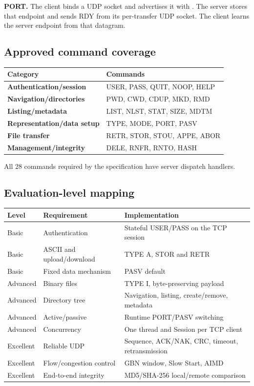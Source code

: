 \textbf{PORT.} The client binds a UDP socket and advertises it with
. The server stores that endpoint and sends RDY
from its per-transfer UDP socket. The client learns the server endpoint from
that datagram.

\subsection{Approved command coverage}

\begin{tabularx}{\textwidth}{>{\bfseries}p{}X}
\toprule
Category & Commands\\
\midrule
Authentication/session & USER, PASS, QUIT, NOOP, HELP\\
Navigation/directories & PWD, CWD, CDUP, MKD, RMD\\
Listing/metadata & LIST, NLST, STAT, SIZE, MDTM\\
Representation/data setup & TYPE, MODE, PORT, PASV\\
File transfer & RETR, STOR, STOU, APPE, ABOR\\
Management/integrity & DELE, RNFR, RNTO, HASH\\
\bottomrule
\end{tabularx}

All 28 commands required by the specification have server dispatch handlers.

\subsection{Evaluation-level mapping}

\begin{longtable}{p{}p{}p{}}
\toprule
Level & Requirement & Implementation\\
\midrule
Basic & Authentication & Stateful USER/PASS on the TCP session\\
Basic & ASCII and upload/download & TYPE A, STOR and RETR\\
Basic & Fixed data mechanism & PASV default\\
Advanced & Binary files & TYPE I, byte-preserving payload\\
Advanced & Directory tree & Navigation, listing, create/remove, metadata\\
Advanced & Active/passive & Runtime PORT/PASV switching\\
Advanced & Concurrency & One thread and Session per TCP client\\
Excellent & Reliable UDP & Sequence, ACK/NAK, CRC, timeout, retransmission\\
Excellent & Flow/congestion control & GBN window, Slow Start, AIMD\\
Excellent & End-to-end integrity & MD5/SHA-256 local/remote comparison\\
\bottomrule
\end{longtable}
